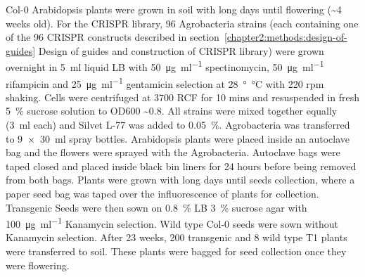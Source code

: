 \documentclass[../main.tex]{subfiles}
\begin{document}
Col-0 Arabidopsis plants were grown in soil with long days until flowering (\textasciitilde{}4 weeks old).
For the CRISPR library, 96 Agrobacteria strains (each containing one of the 96 CRISPR constructs described in section~\ref{chapter2:methods:design-of-guides} Design of guides and construction of CRISPR library) were grown overnight in \SI{5}{\ml} liquid LB with \SI{50}{\micro\gram\per\ml} spectinomycin, \SI{50}{\micro\gram\per\ml} rifampicin and \SI{25}{\micro\gram\per\ml} gentamicin selection at \SI{28}{\degree\celsius} with 220 rpm shaking.
Cells were centrifuged at 3700 RCF for 10 mins and resuspended in fresh \SI{5}{\percent} sucrose solution to OD600 \textasciitilde{}0.8.
All strains were mixed together equally (\SI{3}{\ml} each) and Silvet L-77 was added to \SI{0.05}{\percent}.
Agrobacteria was transferred to \SI{9x30}{\ml} spray bottles.
Arabidopsis plants were placed inside an autoclave bag and the flowers were sprayed with the Agrobacteria.
Autoclave bags were taped closed and placed inside black bin liners for 24 hours before being removed from both bags.
Plants were grown with long days until seeds collection, where a paper seed bag was taped over the influorescence of plants for collection.
Transgenic Seeds were then sown on \SI{0.8}{\percent} LB \SI{3}{\percent} sucrose agar with \SI{100}{\micro\gram\per\ml} Kanamycin selection.
Wild type Col-0 seeds were sown without Kanamycin selection.
After 2\textendash{}3 weeks, 200 transgenic and 8 wild type T1 plants were transferred to soil.
These plants were bagged for seed collection once they were flowering.
\end{document}

